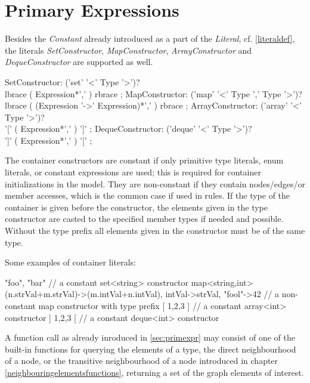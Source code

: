 \section{Primary Expressions}\label{sec:containerprimexpr}

Besides the \emph{Constant} already introduced as a part of the \emph{Literal}, cf. \ref{literaldef}, the literals \emph{SetConstructor}, \emph{MapConstructor}, \emph{ArrayConstructor} and \emph{DequeConstructor} are supported as well.

\begin{rail}
  SetConstructor: ('set' '<' Type '>')? \\ lbrace ( Expression*',' ) rbrace ;
  MapConstructor: ('map' '<' Type ',' Type '>')? \\ lbrace ( (Expression '->' Expression)*',' ) rbrace ;
  ArrayConstructor: ('array' '<' Type '>')? \\ '[' ( Expression*',' ) ']' ;
  DequeConstructor: ('deque' '<' Type '>')? \\ ']' ( Expression*',' ) '[' ;
\end{rail}

The container constructors are constant if only primitive type literals, enum literals, or constant expressions are used; this is required for container initializations in the model.
They are non-constant if they contain nodes/edges/or member accesses, which is the common case if used in rules.
If the type of the container is given before the constructor, the elements given in the type constructor are casted to the specified member types if needed and possible.
Without the type prefix all elements given in the constructor must be of the same type.

\begin{example}
Some examples of container literals:
\begin{grgen}
{ "foo", "bar" } // a constant set<string> constructor
map<string,int>{ (n.strVal+m.strVal)->(m.intVal+n.intVal), intVal->strVal, "fool"->42 } // a non-constant map constructor with type prefix
[ 1,2,3 ] // a constant array<int> constructor
] 1,2,3 [ // a constant deque<int> constructor
\end{grgen}
\end{example}

A function call as already inroduced in \ref{sec:primexpr} may consist of one of the built-in functions for querying the elements of a type, the direct neighbourhood of a node, or the transitive neighbourhood of a node introduced in chapter \ref{neighbouringelementsfunctions}, returning a set of the graph elements of interest.

